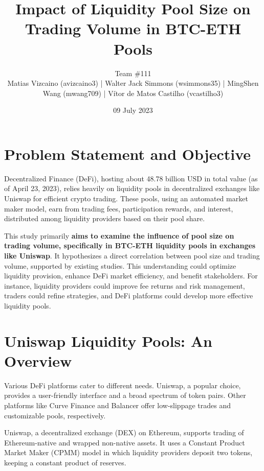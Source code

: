 \documentclass{article}
\makeatletter
\renewcommand{\maketitle}{\bgroup\setlength{\parindent}{0pt}
\begin{center} %
  \Large\@title
  \newline
  \footnotesize\@author
\end{center}
\begin{flushright}
  \@date
\end{flushright}
\egroup}
\makeatother
\begin{document}
\title{Impact of Liquidity Pool Size on Trading Volume in BTC-ETH Pools}
\author{
  Team \#111 \\
   \scriptsize Matias Vizcaino (avizcaino3) | Walter Jack Simmons (wsimmons35) | MingShen Wang (mwang709) | Vítor de Matos Castilho (vcastilho3)
}
\date{09 July 2023}
\maketitle

\noindent


\section*{\textbf{Problem Statement and Objective}}

Decentralized Finance (DeFi), hosting about 48.78 billion USD in total value (as of April 23, 2023\cite{defillama}), relies heavily on liquidity pools in decentralized exchanges like Uniswap for efficient crypto trading. These pools, using an automated market maker model, earn from trading fees, participation rewards, and interest, distributed among liquidity providers based on their pool share\cite{Miori2022,Aigner2021,Xu2023}.

This study primarily \textbf{aims to examine the influence of pool size on trading volume, specifically in BTC-ETH liquidity pools in exchanges like Uniswap}. It hypothesizes a direct correlation between pool size and trading volume, supported by existing studies\cite{Miori2022,Heimbach2022}. This understanding could optimize liquidity provision, enhance DeFi market efficiency, and benefit stakeholders. For instance, liquidity providers could improve fee returns and risk management, traders could refine strategies, and DeFi platforms could develop more effective liquidity pools\cite{Makarov2022,Miori2023}.

\section*{\textbf{Uniswap Liquidity Pools: An Overview}}

Various DeFi platforms cater to different needs. Uniswap, a popular choice, provides a user-friendly interface and a broad spectrum of token pairs. Other platforms like Curve Finance and Balancer offer low-slippage trades and customizable pools, respectively\cite{Xu2023}.

Uniswap, a decentralized exchange (DEX) on Ethereum, supports trading of Ethereum-native and wrapped non-native assets. It uses a Constant Product Market Maker (CPMM) model in which liquidity providers deposit two tokens, keeping a constant product of reserves\cite{Miori2023, Heimbach2022,Miori2023}.
\end{document}
